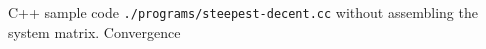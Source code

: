 
\begin{SolutionSheet}[\ref{sheet8}]

  \begin{Solution}
  \end{Solution}

  \begin{Solution}
  \end{Solution}

  \begin{Solution}
  \end{Solution}

  \begin{Solution}[Programming]
    C++ sample code \lstinline{./programs/steepest-decent.cc} without
    assembling the system matrix. Convergence
  \end{Solution}

\end{SolutionSheet}


